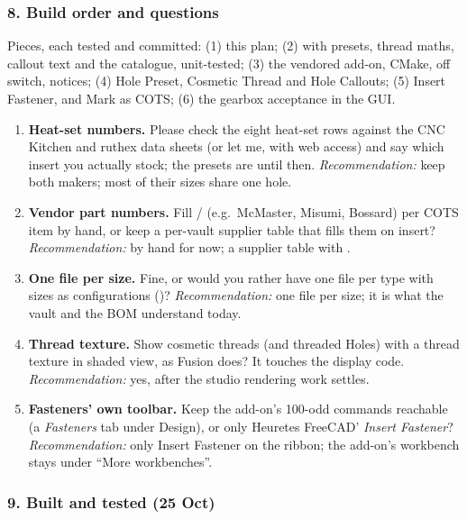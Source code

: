 \subsubsection*{8. Build order and questions}

Pieces, each tested and committed: (1) this plan; (2)  with presets, thread maths,
callout text and the catalogue, unit-tested; (3) the vendored add-on, CMake, off switch, notices; (4) Hole
Preset, Cosmetic Thread and Hole Callouts; (5) Insert Fastener,  and Mark as COTS; (6)
the gearbox acceptance in the GUI.

\begin{enumerate}
  \item \textbf{Heat-set numbers.} Please check the eight heat-set rows against the CNC Kitchen and ruthex
        data sheets (or let me, with web access) and say which insert you actually stock; the presets are
         until then. \emph{Recommendation:} keep both makers; most of their sizes share
        one hole.
  \item \textbf{Vendor part numbers.} Fill / (e.g.\ McMaster, Misumi,
        Bossard) per COTS item by hand, or keep a per-vault supplier table that fills them on insert?
        \emph{Recommendation:} by hand for now; a supplier table with .
  \item \textbf{One file per size.} Fine, or would you rather have one file per type with sizes as
        configurations ()? \emph{Recommendation:} one file per size; it is what the vault and the
        BOM understand today.
  \item \textbf{Thread texture.} Show cosmetic threads (and threaded Holes) with a thread texture in shaded
        view, as Fusion does? It touches the display code. \emph{Recommendation:} yes, after the studio
        rendering work settles.
  \item \textbf{Fasteners' own toolbar.} Keep the add-on's 100-odd commands reachable (a \emph{Fasteners} tab
        under Design), or only Heuretes FreeCAD' \emph{Insert Fastener}? \emph{Recommendation:} only Insert
        Fastener on the ribbon; the add-on's workbench stays under ``More workbenches''.
\end{enumerate}

\subsubsection*{9. Built and tested (25 Oct)}

